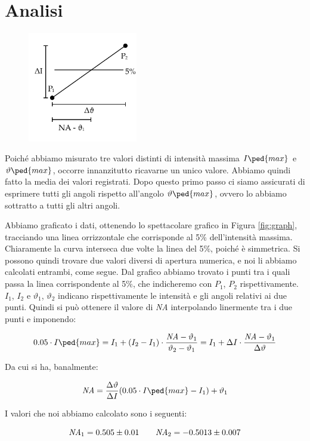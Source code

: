 \section{Analisi}

\begin{figure}
    \vspace{-10mm}
    \begin{center}
        \includegraphics[width=48mm]{drawing.pdf}
    \end{center}
    \vspace{-10mm}
\end{figure}

Poiché abbiamo misurato tre valori distinti di intensità massima $I\ped{max}$ e $\vartheta\ped{max}$, occorre innanzitutto ricavarne un unico valore. Abbiamo quindi fatto la media dei valori registrati. Dopo questo primo passo ci siamo assicurati di esprimere tutti gli angoli rispetto
all'angolo $\vartheta\ped{max}$, ovvero lo abbiamo sottratto a tutti gli altri angoli.

Abbiamo graficato i dati, ottenendo lo spettacolare grafico in Figura \ref{fig:graph}, tracciando una linea orrizzontale
che corrisponde al 5\% dell'intensità massima. Chiaramente la curva interseca due volte la linea del 5\%, poiché è simmetrica.
Si possono quindi trovare due valori diversi di apertura numerica, e noi li abbiamo calcolati entrambi, come segue.
Dal grafico abbiamo trovato i punti tra i quali passa la linea corrispondente al 5\%,
che indicheremo con $P_1$, $P_2$ rispettivamente. $I_1$, $I_2$ e $\vartheta_1$, $\vartheta_2$ indicano rispettivamente le intensità e gli angoli
relativi ai due punti. Quindi si può ottenere il valore di \emph{NA} interpolando linermente tra i due punti e imponendo:

\begin{equation}
        0.05 \cdot I\ped{max} = I_1 + (I_2 - I_1) \cdot \frac{\emph{NA} - \vartheta_1}{\vartheta_2 - \vartheta_1} \\
                              = I_1 + \Delta I \cdot \frac{\emph{NA} - \vartheta_1}{\Delta \vartheta}
\end{equation}

Da cui si ha, banalmente:

\begin{equation}
    \emph{NA} = \frac{\Delta \vartheta}{\Delta I} (0.05 \cdot I\ped{max} - I_1) + \vartheta_1
\end{equation}

I valori che noi abbiamo calcolato sono i seguenti:

\begin{equation}
    \emph{NA}_1 = 0.505 \pm 0.01 \qquad \emph{NA}_2 = -0.5013 \pm 0.007
\end{equation}
